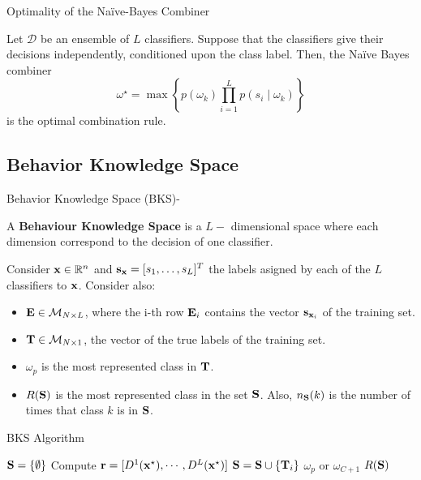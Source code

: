 \documentclass[xcolor=table]{beamer}
\begin{document}
\begin{frame}{Optimality of the Naïve-Bayes Combiner}
    \begin{theorem}
        Let \(\mathbf{\mathcal D}\) be an ensemble of \(L\) classifiers. Suppose that the classifiers give their decisions independently, conditioned upon the class label. Then, the Naïve Bayes combiner 
        \[
        \omega^\star = \max \left\{p(\omega_k) \prod_{i=1}^L p(s_i \mid \omega_k)\right\}
        \]
        is the optimal combination rule.
    \end{theorem}
\end{frame}



\subsection{Behavior Knowledge Space}

\begin{frame}{Behavior Knowledge Space (BKS)-\citep{BKS1995}}

A  \textbf{Behaviour Knowledge Space} is a \(L-\) dimensional space where each dimension correspond to the decision of one classifier.\\
\pause

    Consider \({\mathbf x} \in {\mathbb R}^n\) and \({\mathbf s}_{\mathbf x} = [s_1,\dots,s_L]^T\) the labels asigned by each of the \(L\) classifiers to \({\mathbf x}\). Consider also:
    \begin{itemize}
        \item \({\mathbf E} \in \mathcal M_{N\times L}\), where the i-th row \({\mathbf E}_i\) contains the vector \({\mathbf s}_{{\mathbf x}_i}\) of the training set.
        \item \({\mathbf T} \in \mathcal M_{N\times 1}\), the vector of the true labels of the training set.
        \item \(\omega_p\) is the most represented class in \({\mathbf T}\).
        \item \(R({\mathbf S})\) is the most represented class in the set \({\mathbf S}\). Also, \(n_{\mathbf S}(k)\) is the number of times that class \(k\) is in \({\mathbf S}\).
    \end{itemize}
\end{frame}

\begin{frame}{BKS Algorithm}

\begin{algorithm}[H]
\begin{algorithmic}[1]

\STATE \({\mathbf S} = \{\emptyset\}\)
\STATE Compute \({\mathbf r} = [D^1({\mathbf x}^\star),\cdots,D^L({\mathbf x}^\star)]\)
\STATE \({\mathbf S} = {\mathbf S} \cup \{{\mathbf T}_i\}\)
\ENDIF
\ENDFOR
\IF{\(\bS == \{\emptyset\}\)}
\RETURN \(\omega_p\) or \(\omega_{C+1}\)
\ELSE
\RETURN \(R({\mathbf S})\)
\ENDIF
\end{algorithmic}
\caption{BKS Combiner}
\label{alg:seq}
\end{algorithm}
\end{frame}
\end{document}
